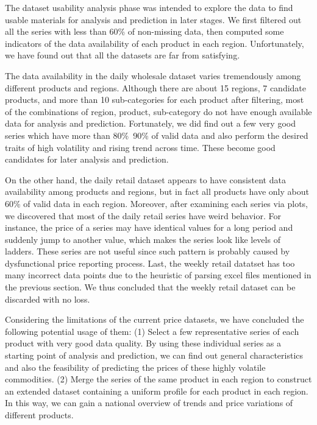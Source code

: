 The dataset usability analysis phase was intended to explore the data to find usable materials for analysis and prediction in later stages. We first filtered out all the series with less than 60\% of non-missing data, then computed some indicators of the data availability of each product in each region. Unfortunately, we have found out that all the datasets are far from satisfying.

The data availability in the daily wholesale dataset varies tremendously among different products and regions. Although there are about 15 regions, 7 candidate products, and more than 10 sub-categories for each product after filtering, most of the combinations of region, product, sub-category do not have enough available data for analysis and prediction. Fortunately, we did find out a few very good series which have more than 80\%~90\% of valid data and also perform the desired traits of high volatility and rising trend across time. These become good candidates for later analysis and prediction.

On the other hand, the daily retail dataset appears to have consistent data availability among products and regions, but in fact all products have only about 60\% of valid data in each region. Moreover, after examining each series via plots, we discovered that most of the daily retail series have weird behavior. For instance, the price of a series may have identical values for a long period and suddenly jump to another value, which makes the series look like levels of ladders. These series are not useful since such pattern is probably caused by dysfunctional price reporting process. Last, the weekly retail datatset has too many incorrect data points due to the heuristic of parsing excel files mentioned in the previous section. We thus concluded that the weekly retail dataset can be discarded with no loss.

Considering the limitations of the current price datasets, we have concluded the following potential usage of them: (1) Select a few representative series of each product with very good data quality. By using these individual series as a starting point of analysis and prediction, we can find out general characteristics and also the feasibility of predicting the prices of these highly volatile commodities. (2) Merge the series of the same product in each region to construct an extended dataset containing a uniform profile for each product in each region. In this way, we can gain a national overview of trends and price variations of different products.

